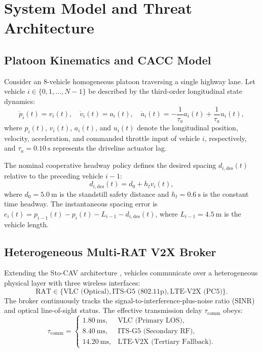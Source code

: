\documentclass[journal]{IEEEtran}
\begin{document}
\section{System Model and Threat Architecture}

\subsection{Platoon Kinematics and CACC Model}
Consider an 8-vehicle homogeneous platoon traversing a single highway lane. Let vehicle $i \in \{0, 1, \dots, N-1\}$ be described by the third-order longitudinal state dynamics:
\begin{equation}
    \dot{p}_i(t) = v_i(t), \quad \dot{v}_i(t) = a_i(t), \quad \dot{a}_i(t) = -\frac{1}{\tau_a} a_i(t) + \frac{1}{\tau_a} u_i(t),
    \label{eq:dynamics}
\end{equation}
where $p_i(t)$, $v_i(t)$, $a_i(t)$, and $u_i(t)$ denote the longitudinal position, velocity, acceleration, and commanded throttle input of vehicle $i$, respectively, and $\tau_a = 0.10~\text{s}$ represents the driveline actuator lag.

The nominal cooperative headway policy defines the desired spacing $d_{i,\text{des}}(t)$ relative to the preceding vehicle $i-1$:
\begin{equation}
    d_{i,\text{des}}(t) = d_0 + h_t v_i(t),
    \label{eq:headway}
\end{equation}
where $d_0 = 5.0~\text{m}$ is the standstill safety distance and $h_t = 0.6~\text{s}$ is the constant time headway. The instantaneous spacing error is $e_i(t) = p_{i-1}(t) - p_i(t) - L_{i-1} - d_{i,\text{des}}(t)$, where $L_{i-1} = 4.5~\text{m}$ is the vehicle length.

\subsection{Heterogeneous Multi-RAT V2X Broker}
Extending the Sto-CAV architecture \cite{masini2025stocav}, vehicles communicate over a heterogeneous physical layer with three wireless interfaces:
\begin{equation}
    \text{RAT} \in \{\text{VLC (Optical)}, \text{ITS-G5 (802.11p)}, \text{LTE-V2X (PC5)}\}.
\end{equation}
The broker continuously tracks the signal-to-interference-plus-noise ratio ($\text{SINR}$) and optical line-of-sight status. The effective transmission delay $\tau_{\text{comm}}$ obeys:
\begin{equation}
    \tau_{\text{comm}} = 
    \begin{cases}
        1.80~\text{ms}, & \text{VLC (Primary LOS)}, \\
        8.40~\text{ms}, & \text{ITS-G5 (Secondary RF)}, \\
        14.20~\text{ms}, & \text{LTE-V2X (Tertiary Fallback)}.
    \end{cases}
\end{equation}
\end{document}
